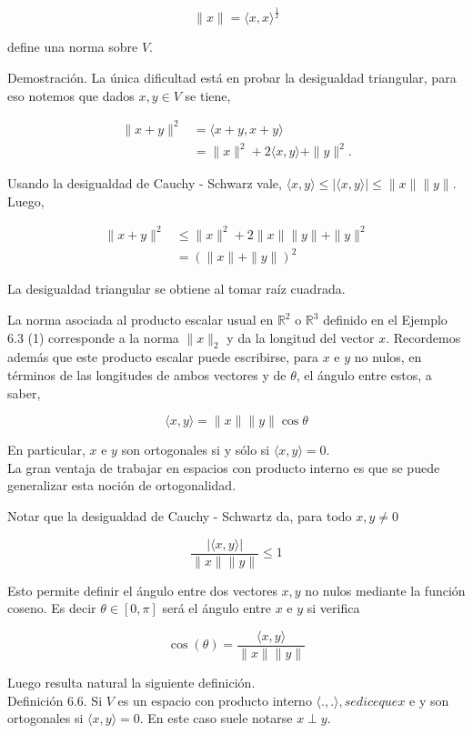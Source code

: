 \documentclass[10pt]{article}
\begin{document}
$$
\|x\|=\langle x, x\rangle^{\frac{1}{2}}
$$

define una norma sobre $V$.

Demostración. La única dificultad está en probar la desigualdad triangular, para eso notemos que dados $x, y \in V$ se tiene,

$$
\begin{aligned}
\|x+y\|^{2} & =\langle x+y, x+y\rangle \\
& =\|x\|^{2}+2\langle x, y\rangle+\|y\|^{2} .
\end{aligned}
$$

Usando la desigualdad de Cauchy - Schwarz vale, $\langle x, y\rangle \leq|\langle x, y\rangle| \leq\|x\|\|y\|$. Luego,

$$
\begin{aligned}
\|x+y\|^{2} & \leq\|x\|^{2}+2\|x\|\|y\|+\|y\|^{2} \\
& =(\|x\|+\|y\|)^{2}
\end{aligned}
$$

La desigualdad triangular se obtiene al tomar raíz cuadrada.

La norma asociada al producto escalar usual en $\mathbb{R}^{2}$ o $\mathbb{R}^{3}$ definido en el Ejemplo 6.3 (1) corresponde a la norma $\|x\|_{2}$ y da la longitud del vector $x$. Recordemos además que este producto escalar puede escribirse, para $x$ e $y$ no nulos, en términos de las longitudes de ambos vectores y de $\theta$, el ángulo entre estos, a saber,

$$
\langle x, y\rangle=\|x\|\|y\| \cos \theta
$$

En particular, $x$ e $y$ son ortogonales si y sólo si $\langle x, y\rangle=0$.\\
La gran ventaja de trabajar en espacios con producto interno es que se puede generalizar esta noción de ortogonalidad.

Notar que la desigualdad de Cauchy - Schwartz da, para todo $x, y \neq 0$

$$
\frac{|\langle x, y\rangle|}{\|x\|\|y\|} \leq 1
$$

Esto permite definir el ángulo entre dos vectores $x, y$ no nulos mediante la función coseno. Es decir $\theta \in[0, \pi]$ será el ángulo entre $x$ e $y$ si verifica

$$
\cos (\theta)=\frac{\langle x, y\rangle}{\|x\|\|y\|}
$$

Luego resulta natural la siguiente definición.\\
Definición 6.6. Si $V$ es un espacio con producto interno $\langle.,$.$\rangle , se dice que x$ e y son ortogonales si $\langle x, y\rangle=0$. En este caso suele notarse $x \perp y$.
\end{document}
